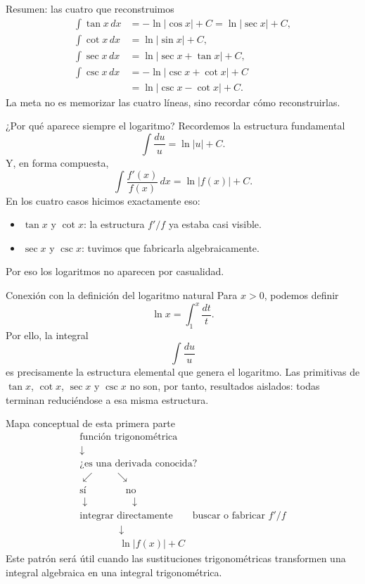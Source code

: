 \documentclass[10pt,aspectratio=169]{beamer}
\begin{document}
\begin{frame}{Resumen: las cuatro que reconstruimos}
\small
\[
\boxed{
\begin{aligned}
\int\tan x\,dx
&=-\ln|\cos x|+C
=\ln|\sec x|+C,\\[1mm]
\int\cot x\,dx
&=\ln|\sin x|+C,\\[1mm]
\int\sec x\,dx
&=\ln|\sec x+\tan x|+C,\\[1mm]
\int\csc x\,dx
&=-\ln|\csc x+\cot x|+C\\
&=\ln|\csc x-\cot x|+C.
\end{aligned}}
\]
La meta no es memorizar las cuatro líneas, sino recordar cómo reconstruirlas.
\end{frame}

\begin{frame}{¿Por qué aparece siempre el logaritmo?}
Recordemos la estructura fundamental
\[
\boxed{\int\frac{du}{u}=\ln|u|+C.}
\]
Y, en forma compuesta,
\[
\boxed{\int\frac{f'(x)}{f(x)}\,dx=\ln|f(x)|+C.}
\]
En los cuatro casos hicimos exactamente eso:
\begin{itemize}
\item $\tan x$ y $\cot x$: la estructura $f'/f$ ya estaba casi visible.
\item $\sec x$ y $\csc x$: tuvimos que fabricarla algebraicamente.
\end{itemize}
Por eso los logaritmos no aparecen por casualidad.
\end{frame}

\begin{frame}{Conexión con la definición del logaritmo natural}
Para $x>0$, podemos definir
\[
\boxed{\ln x=\int_1^x\frac{dt}{t}.}
\]
Por ello, la integral
\[
\int\frac{du}{u}
\]
es precisamente la estructura elemental que genera el logaritmo.
\vspace{2mm}
Las primitivas de $\tan x$, $\cot x$, $\sec x$ y $\csc x$ no son, por tanto, resultados aislados: todas terminan reduciéndose a esa misma estructura.
\end{frame}

\begin{frame}{Mapa conceptual de esta primera parte}
\[
\boxed{
\begin{array}{c}
\text{función trigonométrica}\\[1mm]
\downarrow\\
\text{¿es una derivada conocida?}\\[1mm]
\swarrow\qquad\searrow\\[-1mm]
\text{sí}\qquad\qquad\text{no}\\
\downarrow\qquad\qquad\downarrow\\
\text{integrar directamente}\qquad
\text{buscar o fabricar }f'/f\\[1mm]
\qquad\qquad\downarrow\\
\qquad\qquad\ln|f(x)|+C
\end{array}}
\]
Este patrón será útil cuando las sustituciones trigonométricas transformen una integral algebraica en una integral trigonométrica.
\end{frame}
\end{document}

